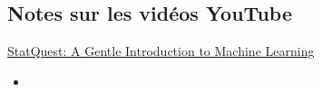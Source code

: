 \documentclass[12pt, titlepage, french]{report}
\begin{document}
\subsection{Notes sur les vidéos YouTube}

\begin{YTB_SUMM}[label = {SQ-BASICS-ML-INTRO}]{\href{https://www.youtube.com/watch?v=Gv9_4yMHFhI&list=PLblh5JKOoLUICTaGLRoHQDuF_7q2GfuJF&index=2&t=0s}{StatQuest: A Gentle Introduction to Machine Learning}}
\begin{itemize}
	\item	
\end{itemize}
\end{YTB_SUMM}

\newpage
\end{document}
